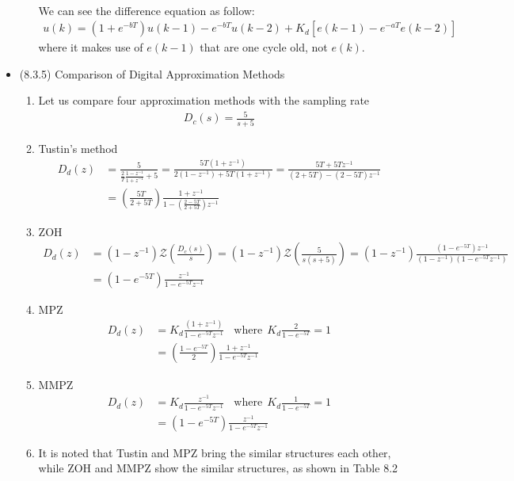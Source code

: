 \documentclass[landscape,14pt]{oblivoir}
\begin{document}
\begin{itemize}
\begin{enumerate}
\begin{align*}
		\end{align*}
		We can see the difference equation as follow:
		\begin{align*}
			u(k) = (1+e^{-bT})u(k-1) - e^{-bT} u(k-2) + K_d [ e(k-1) - e^{-aT} e(k-2) ] 
		\end{align*}
		where it makes use of $e(k-1)$ that are one cycle old, not $e(k)$. 
	\end{enumerate}
%
\newpage
%
	\item (8.3.5) Comparison of Digital Approximation Methods 
	\begin{enumerate}
		\item Let us compare four approximation methods with the sampling rate 
		\begin{align*}
			D_c(s) = \frac{5}{s+5}
		\end{align*}
		\item Tustin's method
		\begin{align*}
			D_d(z) &= \frac{5}{\frac{2}{T} \frac{1-z^{-1}}{1+z^{-1}} +5} = \frac{5T(1+z^{-1})}{2(1-z^{-1}) +5T(1+z^{-1})} = \frac{5T + 5T z^{-1}}{ (2+5T) - (2-5T)z^{-1}} \\
			&= \left( \frac{5T}{2+5T} \right) \frac{ 1+ z^{-1} } { 1 - \left( \frac{2-5T}{2+5T} \right) z^{-1}} 
		\end{align*}
		\item ZOH 
		\begin{align*}
			D_d(z) &= (1-z^{-1}) \mathcal{Z} \left( \frac{D_c(s)}{s} \right) =  (1-z^{-1}) \mathcal{Z} \left( \frac{5}{s(s+5)} \right) =(1-z^{-1})  \frac{(1-e^{-5T})z^{-1}}{(1-z^{-1})(1-e^{-5T}z^{-1})} \\
			&= (1-e^{-5T}) \frac{z^{-1}}{1-e^{-5T}z^{-1}} 
		\end{align*}
		\item MPZ 
		\begin{align*}
			D_d(z) &= K_d \frac{(1+z^{-1})}{1-e^{-5T}z^{-1}} ~~~~\mbox{where}~~ K_d \frac{2}{1-e^{-5T}} = 1 \\
			&= \left( \frac{1-e^{-5T}}{2} \right)  \frac{1+z^{-1}}{1-e^{-5T}z^{-1}}  
		\end{align*}
		\item MMPZ
		\begin{align*}
			D_d(z) &= K_d \frac{z^{-1}}{1-e^{-5T}z^{-1}} ~~~~\mbox{where}~~ K_d \frac{1}{1-e^{-5T}} = 1 \\
			&= (1-e^{-5T}) \frac{z^{-1}}{1-e^{-5T}z^{-1}} 
		\end{align*}
		\item It is noted that Tustin and MPZ bring the similar structures each other, while ZOH and MMPZ show the similar structures, as shown in Table 8.2 

\end{enumerate}
\end{itemize}
\end{document}
